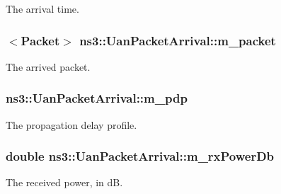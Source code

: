 The arrival time. 

\subsubsection[{\texorpdfstring{m\+\_\+packet}{m_packet}}]{$<${\bf Packet}$>$ ns3\+::\+Uan\+Packet\+Arrival\+::m\+\_\+packet\hspace{0.3cm}{\ttfamily [private]}}\hypertarget{classns3_1_1UanPacketArrival_a045efcea8acaa58e8b08c38aa1e71dd2}{}\label{classns3_1_1UanPacketArrival_a045efcea8acaa58e8b08c38aa1e71dd2}


The arrived packet. 

\subsubsection[{\texorpdfstring{m\+\_\+pdp}{m_pdp}}]{ ns3\+::\+Uan\+Packet\+Arrival\+::m\+\_\+pdp\hspace{0.3cm}{\ttfamily [private]}}\hypertarget{classns3_1_1UanPacketArrival_a1fb86712c5f053734a53143b9eda8267}{}\label{classns3_1_1UanPacketArrival_a1fb86712c5f053734a53143b9eda8267}


The propagation delay profile. 

\subsubsection[{\texorpdfstring{m\+\_\+rx\+Power\+Db}{m_rxPowerDb}}]{\setlength{\rightskip}{0pt plus 5cm}double ns3\+::\+Uan\+Packet\+Arrival\+::m\+\_\+rx\+Power\+Db\hspace{0.3cm}{\ttfamily [private]}}\hypertarget{classns3_1_1UanPacketArrival_a67a4f3655888fc634e1b2055e26d9561}{}\label{classns3_1_1UanPacketArrival_a67a4f3655888fc634e1b2055e26d9561}


The received power, in dB. 

